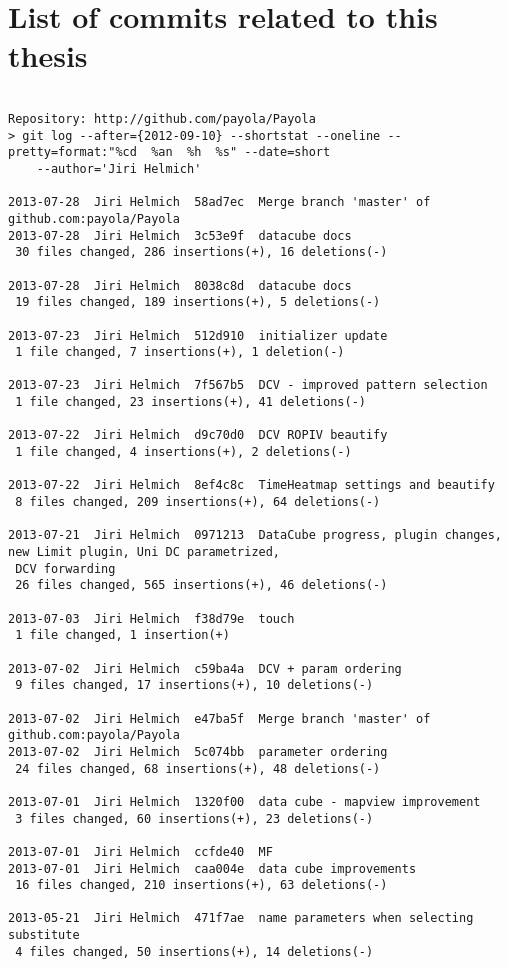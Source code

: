 \chapter{List of commits related to this thesis}
{\scriptsize
\begin{verbatim}

Repository: http://github.com/payola/Payola
> git log --after={2012-09-10} --shortstat --oneline --pretty=format:"%cd  %an  %h  %s" --date=short
    --author='Jiri Helmich'

2013-07-28  Jiri Helmich  58ad7ec  Merge branch 'master' of github.com:payola/Payola
2013-07-28  Jiri Helmich  3c53e9f  datacube docs
 30 files changed, 286 insertions(+), 16 deletions(-)

2013-07-28  Jiri Helmich  8038c8d  datacube docs
 19 files changed, 189 insertions(+), 5 deletions(-)

2013-07-23  Jiri Helmich  512d910  initializer update
 1 file changed, 7 insertions(+), 1 deletion(-)

2013-07-23  Jiri Helmich  7f567b5  DCV - improved pattern selection
 1 file changed, 23 insertions(+), 41 deletions(-)

2013-07-22  Jiri Helmich  d9c70d0  DCV ROPIV beautify
 1 file changed, 4 insertions(+), 2 deletions(-)

2013-07-22  Jiri Helmich  8ef4c8c  TimeHeatmap settings and beautify
 8 files changed, 209 insertions(+), 64 deletions(-)

2013-07-21  Jiri Helmich  0971213  DataCube progress, plugin changes, new Limit plugin, Uni DC parametrized,
 DCV forwarding
 26 files changed, 565 insertions(+), 46 deletions(-)

2013-07-03  Jiri Helmich  f38d79e  touch
 1 file changed, 1 insertion(+)

2013-07-02  Jiri Helmich  c59ba4a  DCV + param ordering
 9 files changed, 17 insertions(+), 10 deletions(-)

2013-07-02  Jiri Helmich  e47ba5f  Merge branch 'master' of github.com:payola/Payola
2013-07-02  Jiri Helmich  5c074bb  parameter ordering
 24 files changed, 68 insertions(+), 48 deletions(-)

2013-07-01  Jiri Helmich  1320f00  data cube - mapview improvement
 3 files changed, 60 insertions(+), 23 deletions(-)

2013-07-01  Jiri Helmich  ccfde40  MF
2013-07-01  Jiri Helmich  caa004e  data cube improvements
 16 files changed, 210 insertions(+), 63 deletions(-)

2013-05-21  Jiri Helmich  471f7ae  name parameters when selecting substitute
 4 files changed, 50 insertions(+), 14 deletions(-)


\end{verbatim}}
